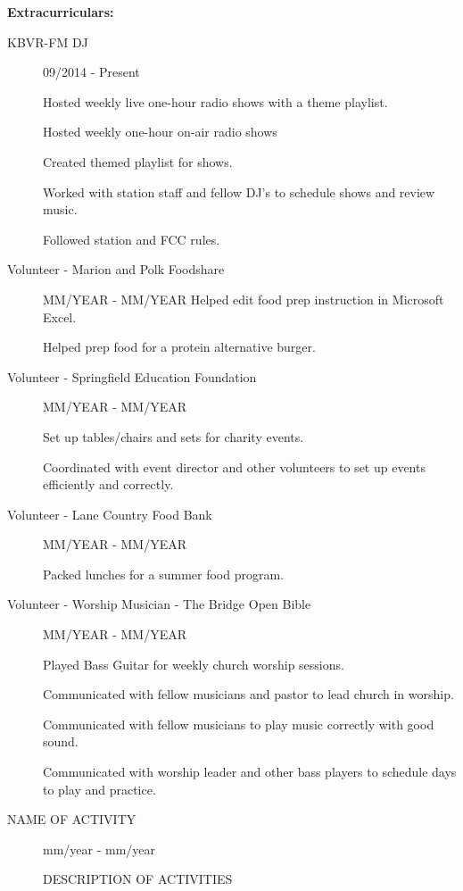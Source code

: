 \documentclass[11pt]{article}
\begin{document}
\smallskip
\hrulefill
\bigskip

{\Large \bf Extracurriculars:}
\begin{description}
    \item[KBVR-FM DJ]
        \hfill  09/2014 - Present

        Hosted weekly live one-hour radio shows with a theme playlist.

        Hosted weekly one-hour on-air radio shows

        Created themed playlist for shows.

        Worked with station staff and fellow DJ's to schedule shows and
        review music.

        Followed station and FCC rules. %

    \item[Volunteer - Marion and Polk Foodshare]
        \hfill  MM/YEAR - MM/YEAR
        Helped edit food prep instruction in Microsoft Excel.

        Helped prep food for a protein alternative burger.

    \item[Volunteer - Springfield Education Foundation] 
        \hfill MM/YEAR - MM/YEAR

        Set up tables/chairs and sets for charity events.

        Coordinated with event director and other volunteers to set up
        events efficiently and correctly. %

    \item[Volunteer - Lane Country Food Bank]
        \hfill MM/YEAR - MM/YEAR

        Packed lunches for a summer food program.

     \item[Volunteer - Worship Musician - The Bridge Open Bible]
        \hfill MM/YEAR - MM/YEAR

        Played Bass Guitar for weekly church worship sessions.

        Communicated with fellow musicians and pastor to lead church in
        worship.

        Communicated with fellow musicians to play music correctly with good
        sound.

        Communicated with worship leader and other bass players to schedule
        days to play and practice.

    \item[NAME OF ACTIVITY]
        \hfill mm/year - mm/year
 
        DESCRIPTION OF ACTIVITIES

\end{description}
\end{document}
